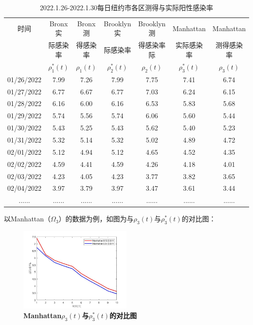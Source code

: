 \documentclass[withoutpreface,bwprint]{cumcmthesis} %
\begin{document}
\begin{table}[H]
\centering
\begin{tabular}{ccccccc}
\toprule
时间 & Bronx实 & Bronx测 & Brooklyn实 & Brooklyn测 & Manhattan & Manhattan \\
     & 际感染率& 得感染率& 际感染率& 得感染率际  &实际感染率   &测得感染率\\
     & $\rho^*_1(t)$ & $\rho_1(t)$& $\rho^*_2(t)$& $\rho_2(t)$  &$\rho^*_3(t)$   &$\rho_3(t)$\\
\midrule
01/26/2022 & 7.99       & 7.26       & 7.99          & 7.75          & 7.41           & 6.74           \\
01/27/2022 & 6.77       & 6.67       & 6.77          & 7.03          & 6.24           & 6.15           \\
01/28/2022 & 6.16       & 6.00       & 6.16          & 6.53          & 5.83           & 5.68           \\
01/29/2022 & 5.74       & 5.56       & 5.74          & 6.06          & 5.60           & 5.44           \\
01/30/2022 & 5.43       & 5.25       & 5.43          & 5.62          & 5.40           & 5.23           \\
01/31/2022 & 5.32       & 5.14       & 5.32          & 5.02          & 4.89           & 4.72           \\
02/01/2022 & 5.12       & 4.94       & 5.12          & 4.65          & 4.52           & 4.35           \\
02/02/2022 & 4.59       & 4.41       & 4.59          & 4.26          & 4.18           & 4.01           \\
02/03/2022 & 4.23       & 4.05       & 4.23          & 3.77          & 3.82           & 3.65           \\
02/04/2022 & 3.97       & 3.79       & 3.97          & 3.47          & 3.61           & 3.44           \\
......     & ......     & ......     & ......        & ......        & ......         & ......        \\
\bottomrule
\end{tabular}
\caption{2022.1.26-2022.1.30每日纽约市各区测得与实际阳性感染率}
\end{table}

以Manhattan（$\Omega_3$）的数据为例，如图为与$\rho_3(t)$与$\rho^*_3(t)$的对比图：
\begin{figure}[H]
\centering
\includegraphics[width=0.5\textwidth]{rho_Manhattan.jpg}%
\caption{\textbf{Manhattan$\rho_3(t)$与$\rho^*_3(t)$的对比图}}
\label{pro1}
\end{figure}
\end{document}
